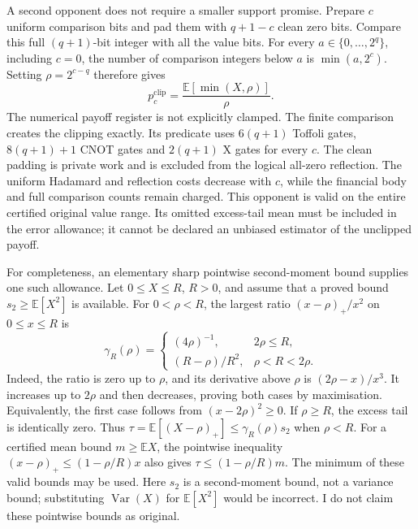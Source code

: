 A second opponent does not require a smaller support promise. Prepare
\(c\) uniform comparison bits and pad them with \(q+1-c\) clean zero
bits. Compare this full \((q+1)\)-bit integer with all the value bits.
For every \(a\in\{0,\ldots,2^q\}\), including \(c=0\),
the number of comparison integers below \(a\) is
\(\min(a,2^c)\). Setting \(\rho=2^{c-q}\) therefore gives
\[
 p_c^{\mathrm{clip}}=\frac{\mathbb E[\min(X,\rho)]}{\rho}.
                                                               \tag{V9}
\]
The numerical payoff register is not explicitly clamped. The finite
comparison creates the clipping exactly. Its predicate uses
\(6(q+1)\) Toffoli gates, \(8(q+1)+1\) CNOT gates and
\(2(q+1)\) X gates for every \(c\). The clean padding is private
work and is excluded from the logical all-zero reflection. The uniform
Hadamard and reflection costs decrease with \(c\), while the financial
body and full comparison counts remain charged. This opponent is valid
on the entire certified original value range. Its omitted excess-tail mean
must be included in the error allowance; it cannot be declared an unbiased
estimator of the unclipped payoff.

For completeness, an elementary sharp pointwise second-moment bound supplies
one such allowance. Let \(0\leq X\leq R\), \(R>0\), and assume
that a proved bound \(s_2\geq\mathbb E[X^2]\) is available. For
\(0<\rho<R\), the largest ratio
\((x-\rho)_+/x^2\) on \(0\leq x\leq R\) is
\[
 \gamma_R(\rho)=
 \begin{cases}
   (4\rho)^{-1},&2\rho\leq R,\\
   (R-\rho)/R^2,&\rho<R<2\rho.
 \end{cases}                                                \tag{V10}
\]
Indeed, the ratio is zero up to \(\rho\), and its derivative above
\(\rho\) is \((2\rho-x)/x^3\). It increases up to \(2\rho\)
and then decreases, proving both cases by maximisation. Equivalently, the
first case follows from \((x-2\rho)^2\geq0\). If
\(\rho\geq R\), the excess tail is identically zero. Thus
\(\tau=\mathbb E[(X-\rho)_+]\leq\gamma_R(\rho)s_2\)
when \(\rho<R\). For a certified mean bound
\(m\geq\mathbb E X\), the pointwise inequality
\((x-\rho)_+\leq(1-\rho/R)x\) also gives
\(\tau\leq(1-\rho/R)m\). The minimum of these valid bounds may be
used. Here \(s_2\) is a second-moment bound, not a variance bound;
substituting \(\operatorname{Var}(X)\) for \(\mathbb E[X^2]\)
would be incorrect. I do not claim these pointwise bounds as original.

